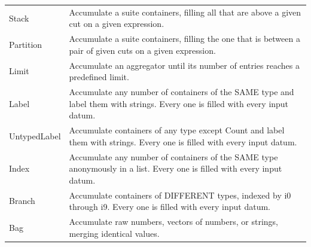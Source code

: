 \documentclass{beamer}
\begin{document}
\begin{frame}
\begin{minipage}{\linewidth}
\begin{tabular}{| p{0.1\linewidth} p{0.9\linewidth} |}
Stack           & Accumulate a suite containers, filling all that are above a given cut on a given expression. \\
Partition       & Accumulate a suite containers, filling the one that is between a pair of given cuts on a given expression. \\\hline
Limit           & Accumulate an aggregator until its number of entries reaches a predefined limit. \\
Label           & Accumulate any number of containers of the SAME type and label them with strings. Every one is filled with every input datum. \\
UntypedLabel    & Accumulate containers of any type except Count and label them with strings. Every one is filled with every input datum. \\
Index           & Accumulate any number of containers of the SAME type anonymously in a list. Every one is filled with every input datum. \\
Branch          & Accumulate containers of DIFFERENT types, indexed by i0 through i9. Every one is filled with every input datum. \\\hline
Bag             & Accumulate raw numbers, vectors of numbers, or strings, merging identical values. \\\hline
\end{tabular}
\end{minipage}
\end{frame}
\end{document}
